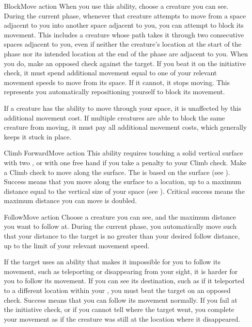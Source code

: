     \begin{activeability}{Block}{Move action}
      \abilitytags {}
      \rankline
      When you use this ability, choose a creature you can see.
      During the current phase, whenever that creature attempts to move from a space adjacent to you into another space adjacent to you, you can attempt to block its movement.
      This includes a creature whose path takes it through two consecutive spaces adjacent to you, even if neither the creature's location at the start of the phase nor its intended location at the end of the phase are adjacent to you.
      When you do, make an opposed  check against the target.
      If you beat it on the initiative check, it must spend additional movement equal to one of your relevant movement speeds to move from its space.
      If it cannot, it stops moving.
      This represents you automatically repositioning yourself to block its movement.

      If a creature has the ability to move through your space, it is unaffected by this additional movement cost.
      If multiple creatures are able to block the same creature from moving, it must pay all additional movement costs, which generally keeps it stuck in place.
    \end{activeability}

    \begin{activeability}{Climb Forward}{Move action}
      \rankline
      This ability requires touching a solid vertical surface with two , or with one free hand if you take a  penalty to your Climb check.
      Make a Climb check to move along the surface.
      The  is based on the surface (see ).
      Success means that you move along the surface to a location, up to a maximum distance equal to the vertical size of your space (see ).
      Critical success means the maximum distance you can move is doubled.
    \end{activeability}

    \begin{activeability}{Follow}{Move action}
      \rankline
      Choose a creature you can see, and the maximum distance you want to follow at.
      During the current phase, you automatically move such that your distance to the target is no greater than your desired follow distance, up to the limit of your relevant movement speed.

      If the target uses an ability that makes it impossible for you to follow its movement, such as teleporting or disappearing from your sight, it is harder for you to follow its movement.
      If you can see its destination, such as if it teleported to a different location within your , you must beat the target on an opposed  check.
      Success means that you can follow its movement normally.
      If you fail at the initiative check, or if you cannot tell where the target went, you complete your movement as if the creature was still at the location where it disappeared.
    \end{activeability}


